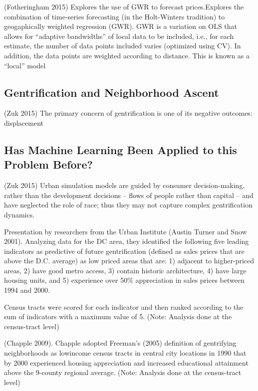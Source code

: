 \documentclass[]{article}
\begin{document}
(Fotheringham 2015) Explores the use of GWR to forecast prices.Explores
the combination of time-series forecasting (in the Holt-Winters
tradition) to geogaphically weighted regression (GWR). GWR is a
variation on OLS that allows for ``adaptive bandwidths'' of local data
to be included, i.e., for each estimate, the number of data points
included varies (optimized using CV). In addition, the data points are
weighted according to distance. This is known as a ``local'' model

\subsection{Gentrification and Neighborhood
Ascent}\label{gentrification-and-neighborhood-ascent}

(Zuk 2015) The primary concern of gentrification is one of its negative
outcomes: displacement

\subsection{Has Machine Learning Been Applied to this Problem
Before?}\label{has-machine-learning-been-applied-to-this-problem-before}

(Zuk 2015) Urban simulation models are guided by consumer
decision-making, rather than the development decisions -- flows of
people rather than capital -- and have neglected the role of race; thus
they may not capture complex gentrification dynamics.

Presentation by researchers from the Urban Institute (Austin Turner and
Snow 2001). Analyzing data for the DC area, they identified the
following five leading indicators as predictive of future gentrification
(defined as sales prices that are above the D.C. average) as low priced
areas that are: 1) adjacent to higher-priced areas, 2) have good metro
access, 3) contain historic architecture, 4) have large housing units,
and 5) experience over 50\% appreciation in sales prices between 1994
and 2000.

Census tracts were scored for each indicator and then ranked according
to the sum of indicators with a maximum value of 5. (Note: Analysis done
at the census-tract level)

(Chapple 2009). Chapple adopted Freeman's (2005) definition of
gentrifying neighborhoods as lowincome census tracts in central city
locations in 1990 that by 2000 experienced housing appreciation and
increased educational attainment above the 9-county regional average.
(Note: Analysis done at the census-tract level)
\end{document}
